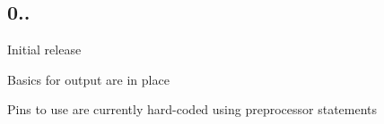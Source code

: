 \subsection*{0..}


\begin{DoxyItemize}
\item Initial release
\item Basics for output are in place
\item Pins to use are currently hard-\/coded using preprocessor statements 
\end{DoxyItemize}